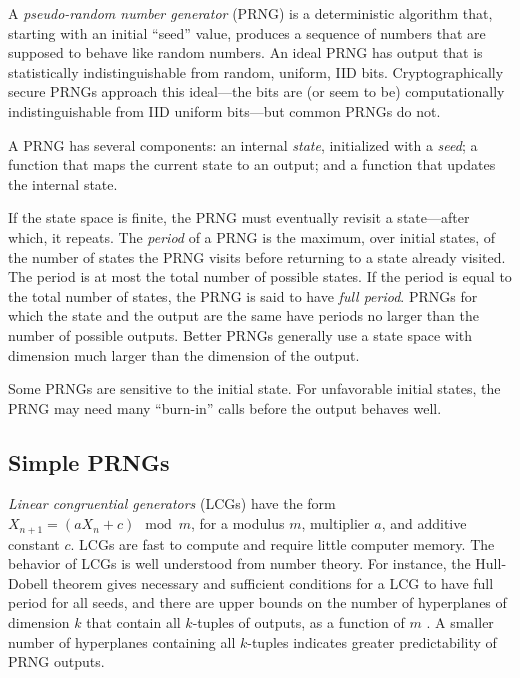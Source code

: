 \documentclass[graybox]{svmult}
\begin{document}
A \emph{pseudo-random number generator} (PRNG) is a deterministic algorithm that, starting with
an initial ``seed'' value, produces a sequence of numbers that are supposed to behave like random numbers.
An ideal PRNG has output that is statistically indistinguishable from random, uniform, IID bits. 
Cryptographically secure PRNGs approach this ideal---the bits are (or seem to be) computationally 
indistinguishable from IID uniform bits---but common PRNGs do not.

A PRNG has several components:
an internal \emph{state}, initialized with a \emph{seed};
a function that maps the current state to an output;
and a function that updates the internal state.

If the state space is finite, the PRNG must eventually revisit a state---after which, it repeats.
The \emph{period} of a PRNG is the maximum, over initial states, of the number of states 
the PRNG visits before returning to a state already visited.
The period is at most the total number of possible states.
If the period is equal to the total number of states, the PRNG is said to have \emph{full period}.
PRNGs for which the state and the output are the same have periods no larger than the number of possible outputs.
Better PRNGs generally use a state space with dimension much larger than the dimension of the output.

Some PRNGs are sensitive to the initial state.
For unfavorable initial states, the PRNG may need many ``burn-in'' calls before the output behaves well.

\subsection{Simple PRNGs}



\emph{Linear congruential generators} (LCGs) have the form $X_{n+1} = (a X_n + c) \mod m$, for a 
modulus $m$, multiplier $a$, and additive constant $c$.
LCGs are fast to compute and require little computer memory.
The behavior of LCGs is well understood from number theory.
For instance, the Hull-Dobell theorem \cite{hullDobell62}
gives necessary and sufficient conditions for a LCG to have full period for all seeds,
and there are upper bounds on the number of hyperplanes of dimension $k$
that contain all $k$-tuples of outputs, as a function of $m$ \cite{marsaglia_random_1968}.
A smaller number of hyperplanes containing all $k$-tuples indicates greater predictability of PRNG outputs.
\end{document}
